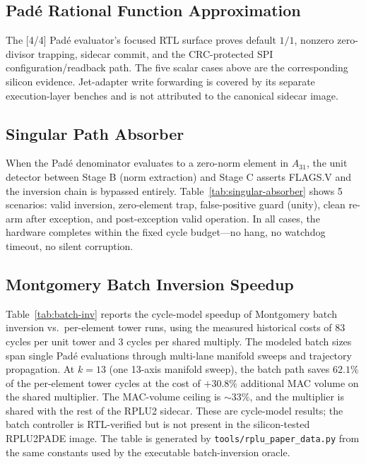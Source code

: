 \documentclass[conference]{IEEEtran}
\begin{document}
\subsection{Pad\'{e} Rational Function Approximation}

The [4/4] Pad\'{e} evaluator's focused RTL surface proves default $1/1$,
nonzero zero-divisor trapping, sidecar commit, and the CRC-protected SPI
configuration/readback path. The five scalar cases above are the corresponding
silicon evidence. Jet-adapter write forwarding is covered by its separate
execution-layer benches and is not attributed to the canonical sidecar image.

\subsection{Singular Path Absorber}

When the Pad\'{e} denominator evaluates to a zero-norm element in
$A_{31}$, the unit detector between Stage B (norm extraction) and Stage C
asserts FLAGS.V and the inversion chain is bypassed entirely.
Table~\ref{tab:singular-absorber} shows 5
scenarios: valid inversion, zero-element trap, false-positive guard
(unity), clean re-arm after exception, and post-exception valid operation.
In all cases, the hardware completes within the fixed cycle budget---no
hang, no watchdog timeout, no silent corruption.

\subsection{Montgomery Batch Inversion Speedup}

Table~\ref{tab:batch-inv} reports the cycle-model speedup of Montgomery
batch inversion vs.\ per-element tower runs, using the measured historical
costs of 83 cycles per unit tower and 3 cycles per shared multiply. The modeled
batch sizes span single Pad\'{e} evaluations through multi-lane
manifold sweeps and trajectory propagation. At $k = 13$ (one 13-axis
manifold sweep), the batch path saves $62.1\%$ of the per-element tower
cycles at the cost of $+30.8\%$ additional MAC volume on the shared
multiplier. The MAC-volume ceiling is $\sim 33\%$, and the multiplier is
shared with the rest of the RPLU2 sidecar. These are cycle-model results; the
batch controller is RTL-verified but is not present in the silicon-tested
RPLU2PADE image. The table is generated by
\texttt{tools/rplu\_paper\_data.py} from the same constants used by the
executable batch-inversion oracle.
\end{document}
